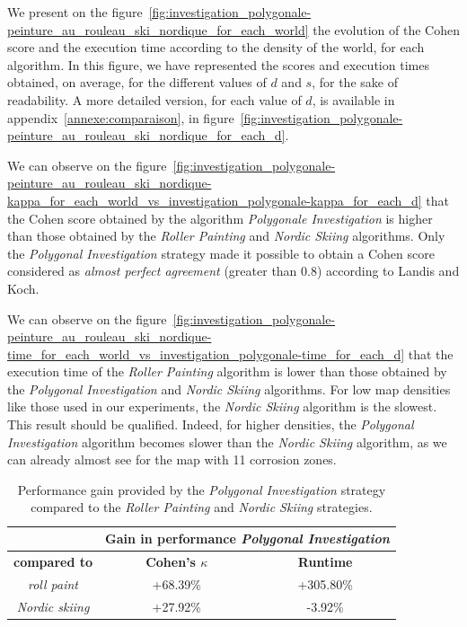 \documentclass[english,RandD]{rapportPFE}  %
\begin{document}
			We present on the figure~\ref{fig:investigation_polygonale-peinture_au_rouleau_ski_nordique_for_each_world} the evolution of the Cohen score and the execution time according to the density of the world, for each algorithm.
			In this figure, we have represented the scores and execution times obtained, on average, for the different values of $d$ and $s$, for the sake of readability.
			A more detailed version, for each value of $d$, is available in appendix~\ref{annexe:comparaison}, in figure~\ref{fig:investigation_polygonale-peinture_au_rouleau_ski_nordique_for_each_d}.

			We can observe on the figure~\ref{fig:investigation_polygonale-peinture_au_rouleau_ski_nordique-kappa_for_each_world_vs_investigation_polygonale-kappa_for_each_d} that the Cohen score obtained by the algorithm \textit{Polygonale Investigation} is higher than those obtained by the \textit{Roller Painting} and \textit{Nordic Skiing} algorithms.
			Only the \textit{Polygonal Investigation} strategy made it possible to obtain a Cohen score considered as \textit{almost perfect agreement} (greater than 0.8) according to Landis and Koch.

			We can observe on the figure~\ref{fig:investigation_polygonale-peinture_au_rouleau_ski_nordique-time_for_each_world_vs_investigation_polygonale-time_for_each_d} that the execution time of the \textit{Roller Painting} algorithm is lower than those obtained by the \textit{Polygonal Investigation} and \textit{Nordic Skiing} algorithms.
			For low map densities like those used in our experiments, the \textit{Nordic Skiing} algorithm is the slowest.
			This result should be qualified.
			Indeed, for higher densities, the \textit{Polygonal Investigation} algorithm becomes slower than the \textit{Nordic Skiing} algorithm, as we can already almost see for the map with 11 corrosion zones.

			\begin{table}[h!]
				\centering
				\begin{tabular}{|c|c|c|}
					\hline
					& \multicolumn{2}{c|}{\textbf{Gain in performance \textit{Polygonal Investigation}}} \\
					\hline
					\textbf{compared to} & \textbf{Cohen's $\kappa$} & \textbf{Runtime} \\
					\hline
					\textit{roll paint} & +68.39\% & +305.80\% \\
					\hline
					\textit{Nordic skiing} & +27.92\% & -3.92\% \\
					\hline
				\end{tabular}
				\caption{Performance gain provided by the \textit{Polygonal Investigation} strategy compared to the \textit{Roller Painting} and \textit{Nordic Skiing} strategies.}
				\label{tab:gain}
			\end{table}
\end{document}
